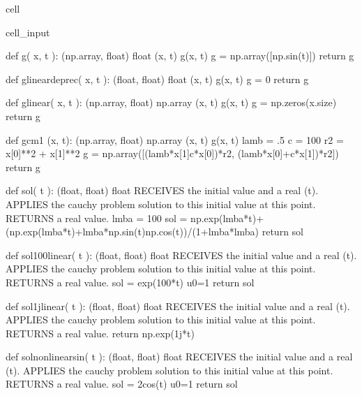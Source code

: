 \documentclass[letterpaper,10pt,english]{jupyterBook}
\begin{document}
\begin{sphinxuseclass}{cell}
\begin{sphinxVerbatimInput}
\begin{sphinxuseclass}{cell_input}
\begin{sphinxVerbatim}[commandchars=\\\{\}]
def g( x, t ):
    \PYGZsq{}\PYGZsq{}\PYGZsq{} (np.array, float) \PYGZhy{}\PYGZgt{} float
        (x, t) \PYGZhy{}\PYGZgt{} g(x, t)
    \PYGZsq{}\PYGZsq{}\PYGZsq{}
    g = np.array([np.sin(t)])
    return g

def g\PYGZus{}linear\PYGZus{}deprec( x, t ):
    \PYGZsq{}\PYGZsq{}\PYGZsq{} (float, float) \PYGZhy{}\PYGZgt{} float
        (x, t) \PYGZhy{}\PYGZgt{} g(x, t)
    \PYGZsq{}\PYGZsq{}\PYGZsq{}
    g = 0
    return g

def g\PYGZus{}linear( x, t ):
    \PYGZsq{}\PYGZsq{}\PYGZsq{} (np.array, float) \PYGZhy{}\PYGZgt{} np.array
        (x, t) \PYGZhy{}\PYGZgt{} g(x, t)
    \PYGZsq{}\PYGZsq{}\PYGZsq{}
    g = np.zeros(x.size)
    return g

def g\PYGZus{}cm1 (x, t):
    \PYGZsq{}\PYGZsq{}\PYGZsq{} (np.array, float) \PYGZhy{}\PYGZgt{} np.array
        (x, t) \PYGZhy{}\PYGZgt{} g(x, t)
    \PYGZsq{}\PYGZsq{}\PYGZsq{}
    lamb = .5
    c = 100
    r\PYGZus{}2 = x[0]**2 + x[1]**2
    g = np.array([(lamb*x[1]\PYGZhy{}c*x[0])*r\PYGZus{}2, \PYGZhy{}(lamb*x[0]+c*x[1])*r\PYGZus{}2])
    return g

def sol( t ):
    \PYGZsq{}\PYGZsq{}\PYGZsq{} (float, float) \PYGZhy{}\PYGZgt{} float
    RECEIVES the initial value and a real (t).
    APPLIES the cauchy problem solution to this initial value at this point.
    RETURNS a real value.
    \PYGZsq{}\PYGZsq{}\PYGZsq{}
    lmba = 100
    sol = np.exp(\PYGZhy{}lmba*t)+(np.exp(\PYGZhy{}lmba*t)+lmba*np.sin(t)\PYGZhy{}np.cos(t))/(1+lmba*lmba)
    return sol

def sol\PYGZus{}100\PYGZus{}linear( t ):
    \PYGZsq{}\PYGZsq{}\PYGZsq{} (float, float) \PYGZhy{}\PYGZgt{} float
    RECEIVES the initial value and a real (t).
    APPLIES the cauchy problem solution to this initial value at this point.
    RETURNS a real value.
    \PYGZsq{}\PYGZsq{}\PYGZsq{}
    sol = exp(\PYGZhy{}100*t) \PYGZsh{}u0=1
    return sol

def sol\PYGZus{}1j\PYGZus{}linear( t ):
    \PYGZsq{}\PYGZsq{}\PYGZsq{} (float, float) \PYGZhy{}\PYGZgt{} float
    RECEIVES the initial value and a real (t).
    APPLIES the cauchy problem solution to this initial value at this point.
    RETURNS a real value.
    \PYGZsq{}\PYGZsq{}\PYGZsq{}
    return np.exp(1j*t)

def sol\PYGZus{}non\PYGZus{}linear\PYGZus{}sin( t ):
    \PYGZsq{}\PYGZsq{}\PYGZsq{} (float, float) \PYGZhy{}\PYGZgt{} float
    RECEIVES the initial value and a real (t).
    APPLIES the cauchy problem solution to this initial value at this point.
    RETURNS a real value.
    \PYGZsq{}\PYGZsq{}\PYGZsq{}
    sol = 2\PYGZhy{}cos(t) \PYGZsh{}u0=1
    return sol


\end{sphinxVerbatim}
\end{sphinxuseclass}
\end{sphinxVerbatimInput}
\end{sphinxuseclass}
\end{document}
